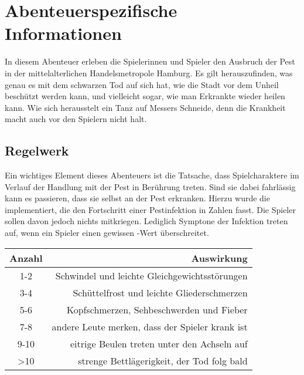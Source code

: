 
\section*{Abenteuerspezifische Informationen}

In diesem Abenteuer erleben die Spielerinnen und Spieler den Ausbruch der Pest in der
mittelalterlichen Handelsmetropole Hamburg. Es gilt herauszufinden, was genau es mit
dem schwarzen Tod auf sich hat, wie die Stadt vor dem Unheil beschützt werden kann, 
und vielleicht sogar, wie man Erkrankte wieder heilen kann. Wie sich herausstelt ein 
Tanz auf Messers Schneide, denn die Krankheit macht auch vor den Spielern nicht halt.

\subsection*{Regelwerk}
\label{ssec:rules}

Ein wichtiges Element dieses Abenteuers ist die Tatsache, dass Spielcharaktere im 
Verlauf der Handlung mit der Pest in Berührung treten. Sind sie dabei fahrlässig 
kann es passieren, dass sie selbst an der Pest erkranken. Hierzu wurde die \Pestilenz
implementiert, die den Fortschritt einer Pestinfektion in Zahlen fasst. Die Spieler 
sollen davon jedoch nichts mitkriegen. Lediglich Symptone der Infektion treten auf, 
wenn ein Spieler einen gewissen \Pestilenz-Wert überschreitet.

\begin{center}
\begingroup
\renewcommand{\arraystretch}{1.4}
  \begin{tabular*}{0.7\textwidth}{@{\extracolsep{\fill}} cr}
    \toprule 
    Anzahl & Auswirkung \\
    \midrule 
    1-2 & Schwindel und leichte Gleichgewichtsstörungen \\
    3-4 & Schüttelfrost und leichte Gliederschmerzen \\
    5-6 & Kopfschmerzen, Sehbeschwerden und Fieber \\
    7-8 & andere Leute merken, dass der Spieler krank ist \\
    9-10 & eitrige Beulen treten unter den Achseln auf \\
    >10 & strenge Bettlägerigkeit, der Tod folg bald \\
    \bottomrule
  \end{tabular*}
\endgroup
\end{center}

